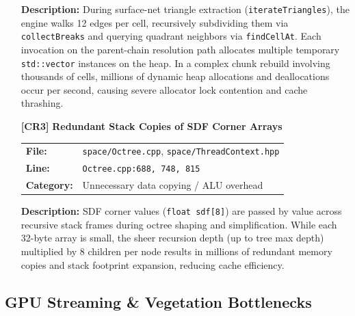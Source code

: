 \documentclass[a4paper,12pt]{article}
\newcommand{\severitybox}[2]{%
  \colorbox{#1}{\makebox[2.5cm][c]{\textcolor{white}{\textbf{#2}}}}%
}
\begin{document}
\begin{enumerate}[leftmargin=*]
  \textbf{Description:}
  During surface-net triangle extraction (\texttt{iterateTriangles}), the engine walks 12 edges per cell, recursively subdividing them via \texttt{collectBreaks} and querying quadrant neighbors via \texttt{findCellAt}. Each invocation on the parent-chain resolution path allocates multiple temporary \texttt{std::vector} instances on the heap. In a complex chunk rebuild involving thousands of cells, millions of dynamic heap allocations and deallocations occur per second, causing severe allocator lock contention and cache thrashing.

\item[\textbf{[CR3]}] \textbf{Redundant Stack Copies of SDF Corner Arrays}
  \hfill \severitybox{mediumcolor}{MEDIUM}

  \begin{tabular}{ll}
    \textbf{File:} & \texttt{space/Octree.cpp}, \texttt{space/ThreadContext.hpp} \\
    \textbf{Line:} & \texttt{Octree.cpp:688, 748, 815} \\
    \textbf{Category:} & Unnecessary data copying / ALU overhead \\
  \end{tabular}

  \textbf{Description:}
  SDF corner values (\texttt{float sdf[8]}) are passed by value across recursive stack frames during octree shaping and simplification. While each 32-byte array is small, the sheer recursion depth (up to tree max depth) multiplied by 8 children per node results in millions of redundant memory copies and stack footprint expansion, reducing cache efficiency.

\end{enumerate}

\subsection{GPU Streaming \& Vegetation Bottlenecks}
\end{document}
